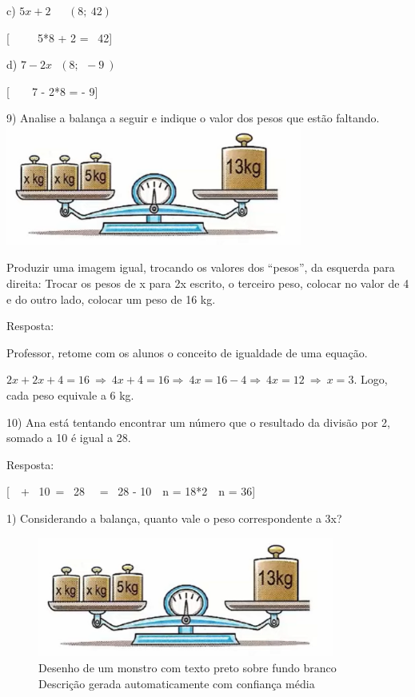 c) \(5x + 2\ \ \ \ \ \ \ (8;\ 42)\)

[\ \ \ \ \ 5*8 + 2 = \ 42]

d) \(7 - 2x\text{\ \ \ \ \ \ \ \ }\left( 8;\ \  - 9\  \right)\)

[\ \ \ \ 7 - 2*8 = - 9]

9) Analise a balança a seguir e indique o valor dos pesos que estão
faltando.
\includegraphics[width=3.82984in,height=1.55017in]{./imgSAEB_7_MAT/media/image23.png}

Produzir uma imagem igual, trocando os valores dos ``pesos'', da
esquerda para direita: Trocar os pesos de x para 2x escrito, o terceiro
peso, colocar no valor de 4 e do outro lado, colocar um peso de 16 kg.

Resposta:

Professor, retome com os alunos o conceito de igualdade de uma equação.

\(2x + 2x + 4 = 16\  \Rightarrow \ 4x + 4 = 16 \Rightarrow \ 4x = 16 - 4 \Rightarrow \ 4x = 12\  \Rightarrow \ x = 3\).
Logo, cada peso equivale a 6 kg.

10) Ana está tentando encontrar um número que o resultado da divisão por
2, somado a 10 é igual a 28.

Resposta:

[\ \  + \ 10\  = \ 28\  \Rightarrow \  = \ 28 - 10\  \Rightarrow \ n = 18*2\  \Rightarrow \ n = 36]


1) Considerando a balança, quanto vale o peso correspondente a 3x?

\begin{figure}
\centering
\includegraphics[width=3.82984in,height=1.55017in]{./imgSAEB_7_MAT/media/image23.png}
\caption{Desenho de um monstro com texto preto sobre fundo branco
Descrição gerada automaticamente com confiança média}
\end{figure}

